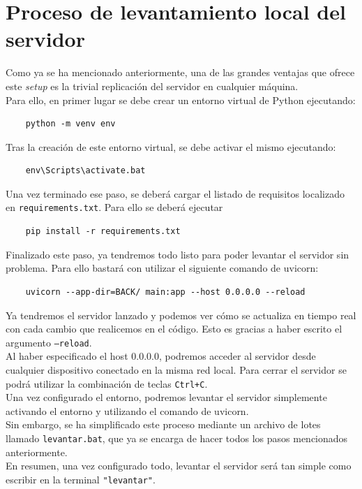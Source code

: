 \documentclass[12pt]{report}
\begin{document}
\section{Proceso de levantamiento local del servidor}
Como ya se ha mencionado anteriormente, una de las grandes ventajas que ofrece este \textit{setup} es la trivial replicación del servidor en cualquier máquina.\\
Para ello, en primer lugar se debe crear un entorno virtual de Python ejecutando:
\begin{verbatim}
    python -m venv env
\end{verbatim}
Tras la creación de este entorno virtual, se debe activar el mismo ejecutando:
\begin{verbatim}
    env\Scripts\activate.bat
\end{verbatim}
Una vez terminado ese paso, se deberá cargar el listado de requisitos localizado en \texttt{requirements.txt}. Para ello se deberá ejecutar
\begin{verbatim}
    pip install -r requirements.txt
\end{verbatim}
Finalizado este paso, ya tendremos todo listo para poder levantar el servidor sin problema. Para ello bastará con utilizar el siguiente comando de uvicorn:
\begin{verbatim}
    uvicorn --app-dir=BACK/ main:app --host 0.0.0.0 --reload
\end{verbatim}
Ya tendremos el servidor lanzado y podemos ver cómo se actualiza en tiempo real con cada cambio que realicemos en el código. Esto es gracias a haber escrito el argumento \texttt{--reload}.\\
Al haber especificado el host 0.0.0.0, podremos acceder al servidor desde cualquier dispositivo conectado en la misma red local.
Para cerrar el servidor se podrá utilizar la combinación de teclas \texttt{Ctrl+C}.\\

Una vez configurado el entorno, podremos levantar el servidor simplemente activando el entorno y utilizando el comando de uvicorn.\\
Sin embargo, se ha simplificado este proceso mediante un archivo de lotes llamado \texttt{levantar.bat}, que ya se encarga de hacer todos los pasos mencionados anteriormente.\\

En resumen, una vez configurado todo, levantar el servidor será tan simple como escribir en la terminal \texttt{"levantar"}.
\end{document}
